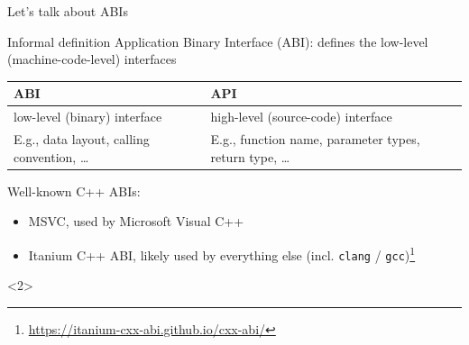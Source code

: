 \begin{frame}{Let's talk about ABIs}
  \begin{block}{Informal definition}
    Application Binary Interface (ABI): defines the low-level (machine-code-level) interfaces\\[4ex]
    \begin{tabular}{|p{}|p{}|}
      \hline
      \textbf{ABI}                                    & \textbf{API} \\
      \hline
      \hline
      low-level (binary) interface                    & high-level (source-code) interface \\
      \hline
      E.g., data layout, calling convention, \ldots{} & E.g., function name, parameter types, return type, \ldots{}\\
      \hline
    \end{tabular}
  \end{block}
  \vfill

  Well-known C++ ABIs:\begin{itemize}
    \item MSVC, used by Microsoft Visual C++
    \item Itanium C++ ABI, likely used by everything else (incl. \texttt{clang} / \texttt{gcc})\footnote{\url{https://itanium-cxx-abi.github.io/cxx-abi/}}
  \end{itemize}

  \begin{onlyenv}<2>
  \end{onlyenv}
\end{frame}

